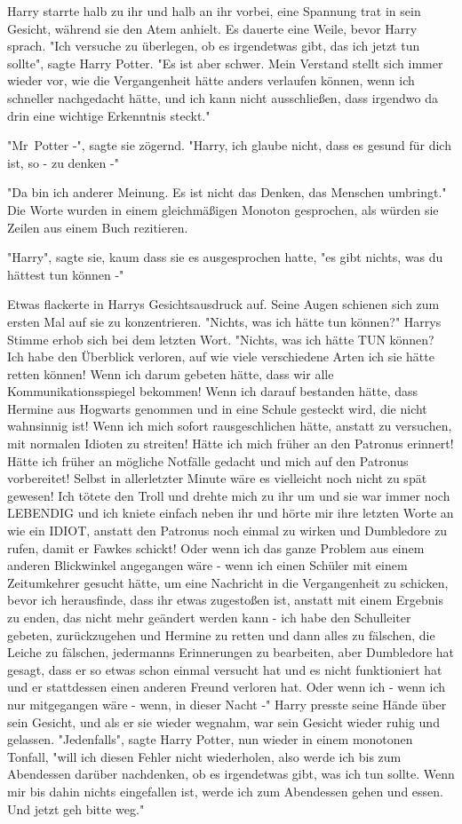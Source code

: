 {Harry starrte halb zu ihr und halb an ihr vorbei, eine Spannung trat in sein Gesicht, während sie den Atem anhielt. Es dauerte eine Weile, bevor Harry sprach. "Ich versuche zu überlegen, ob es irgendetwas gibt, das ich jetzt tun sollte", sagte Harry Potter. "Es ist aber schwer. Mein Verstand stellt sich immer wieder vor, wie die Vergangenheit hätte anders verlaufen können, wenn ich schneller nachgedacht hätte, und ich kann nicht ausschließen, dass irgendwo da drin eine wichtige Erkenntnis steckt."

"Mr~Potter -", sagte sie zögernd. "Harry, ich glaube nicht, dass es gesund für dich ist, so - zu denken -"

"Da bin ich anderer Meinung. Es ist nicht das Denken, das Menschen umbringt." Die Worte wurden in einem gleichmäßigen Monoton gesprochen, als würden sie Zeilen aus einem Buch rezitieren.

"Harry", sagte sie, kaum dass sie es ausgesprochen hatte, "es gibt nichts, was du hättest tun können -"

Etwas flackerte in Harrys Gesichtsausdruck auf. Seine Augen schienen sich zum ersten Mal auf sie zu konzentrieren. "Nichts, was ich hätte tun können?" Harrys Stimme erhob sich bei dem letzten Wort. "Nichts, was ich hätte TUN können? Ich habe den Überblick verloren, auf wie viele verschiedene Arten ich sie hätte retten können! Wenn ich darum gebeten hätte, dass wir alle Kommunikationsspiegel bekommen! Wenn ich darauf bestanden hätte, dass Hermine aus Hogwarts genommen und in eine Schule gesteckt wird, die nicht wahnsinnig ist! Wenn ich mich sofort rausgeschlichen hätte, anstatt zu versuchen, mit normalen Idioten zu streiten! Hätte ich mich früher an den Patronus erinnert! Hätte ich früher an mögliche Notfälle gedacht und mich auf den Patronus vorbereitet! Selbst in allerletzter Minute wäre es vielleicht noch nicht zu spät gewesen! Ich tötete den Troll und drehte mich zu ihr um und sie war immer noch LEBENDIG und ich kniete einfach neben ihr und hörte mir ihre letzten Worte an wie ein IDIOT, anstatt den Patronus noch einmal zu wirken und Dumbledore zu rufen, damit er Fawkes schickt! Oder wenn ich das ganze Problem aus einem anderen Blickwinkel angegangen wäre - wenn ich einen Schüler mit einem Zeitumkehrer gesucht hätte, um eine Nachricht in die Vergangenheit zu schicken, bevor ich herausfinde, dass ihr etwas zugestoßen ist, anstatt mit einem Ergebnis zu enden, das nicht mehr geändert werden kann - ich habe den Schulleiter gebeten, zurückzugehen und Hermine zu retten und dann alles zu fälschen, die Leiche zu fälschen, jedermanns Erinnerungen zu bearbeiten, aber Dumbledore hat gesagt, dass er so etwas schon einmal versucht hat und es nicht funktioniert hat und er stattdessen einen anderen Freund verloren hat. Oder wenn ich - wenn ich nur mitgegangen wäre - wenn, in dieser Nacht -" Harry presste seine Hände über sein Gesicht, und als er sie wieder wegnahm, war sein Gesicht wieder ruhig und gelassen. "Jedenfalls", sagte Harry Potter, nun wieder in einem monotonen Tonfall, "will ich diesen Fehler nicht wiederholen, also werde ich bis zum Abendessen darüber nachdenken, ob es irgendetwas gibt, was ich tun sollte. Wenn mir bis dahin nichts eingefallen ist, werde ich zum Abendessen gehen und essen. Und jetzt geh bitte weg."

}
